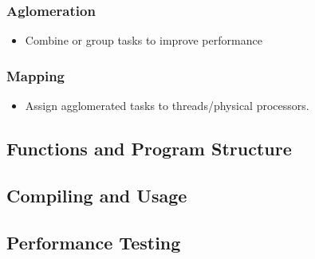 \documentclass{article}
\begin{document}
\subsubsection{Aglomeration}
        \begin{itemize}
            \item Combine or group tasks to improve performance
        \end{itemize}
\subsubsection{Mapping}
        \begin{itemize}
            \item Assign agglomerated tasks to threads/physical processors.
        \end{itemize}


\subsection{Functions and Program Structure}



\subsection{Compiling and Usage}



\subsection{Performance Testing}
\end{document}
